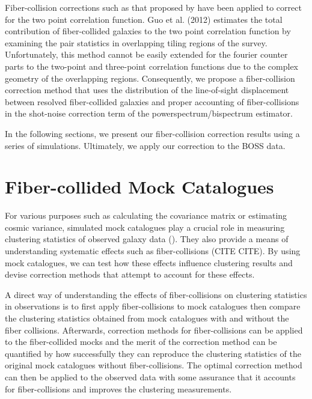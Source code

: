 \documentclass{emulateapj}
\begin{document}
Fiber-collision corrections such as that proposed by \cite{Guo:2012aa} have been applied to correct for the two point correlation function. Guo et al. (2012) estimates the total contribution of fiber-collided galaxies to the two point correlation function by examining the pair statistics in overlapping tiling regions of the survey. Unfortunately, this method cannot be easily extended for the fourier counter parts to the two-point and three-point correlation functions due to the complex geometry of the overlapping regions. Consequently, we propose a fiber-collision correction method that uses the distribution of the line-of-sight displacement between resolved fiber-collided galaxies and proper accounting of fiber-collisions in the shot-noise correction term of the powerspectrum/bispectrum estimator. 
 
In the following sections, we present our fiber-collision correction results using a series of simulations. Ultimately, we apply our correction to the BOSS data. 


\section{Fiber-collided Mock Catalogues} \label{sec:catalog}
For various purposes such as calculating the covariance matrix or estimating cosmic variance, simulated mock catalogues play a crucial role in measuring clustering statistics of observed galaxy data (\citealt{Scoccimarro:2002aa, Anderson:2012aa, Manera:2013aa}). They also provide a means of understanding systematic effects such as fiber-collisions (CITE CITE). By using mock catalogues, we can test how these effects influence clustering results and devise correction methods that attempt to account for these effects.

A direct way of understanding the effects of fiber-collisions on clustering statistics in observations is to first apply fiber-collisions to mock catalogues then compare the clustering statistics obtained from mock catalogues with and without the fiber collisions. Afterwards, correction methods for fiber-collisions can be applied to the fiber-collided mocks and the merit of the correction method can be quantified by how successfully they can reproduce the clustering statistics of the original mock catalogues without fiber-collisions. The optimal correction method can then be applied to the observed data with some assurance that it accounts for fiber-collisions and improves the clustering measurements. 
\end{document}

